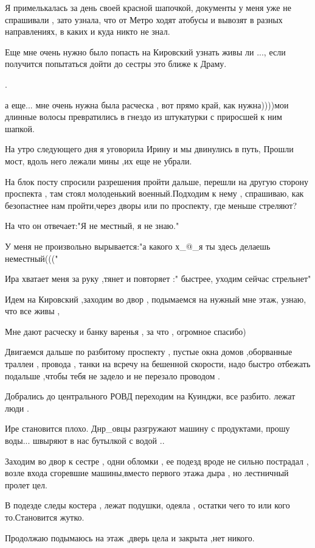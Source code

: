 Я примелькалась за день своей красной шапочкой, документы у меня уже не
спрашивали , зато узнала,  что от Метро ходят атобусы  и вывозят в разных
направлениях, в каких и куда никто не знал.

Еще мне очень нужно было попасть на Кировский узнать живы ли ...,  если
получится попытаться дойти до сестры  это  ближе к Драму. 

.

а еще... мне очень нужна была расческа , вот прямо край, как нужна))))мои
длинные волосы превратились в гнездо из штукатурки с приросшей  к ним шапкой.

На утро следующего дня я уговорила  Ирину и  мы двинулись в путь, Прошли мост,
вдоль него  лежали мины ,их еще не убрали.

На блок посту спросили разрешения пройти дальше,  перешли на другую сторону
проспекта , там стоял молоденький военный.Подходим к нему , спрашиваю, как
безопастнее  нам пройти,через дворы или по проспекту, где меньше стреляют?

На что он отвечает:"Я не местный, я не знаю."

У меня не произвольно вырывается:"а какого х\_@\_я ты здесь делаешь неместный((("

Ира хватает меня за руку ,тянет и повторяет :" быстрее, уходим сейчас
стрельнет"

Идем на Кировский ,заходим во двор , подымаемся на нужный мне этаж, узнаю, что
все живы ,  

Мне дают расческу и банку варенья , за что  , огромное спасибо)

Двигаемся дальше по разбитому проспекту , пустые окна домов ,оборванные траллеи
, провода , танки на всречу на бешенной скорости, надо быстро отбежать подальше
,чтобы тебя не задело и не перезало проводом .

Добрались до центрального РОВД переходим на Куинджи,  все разбито. лежат люди .

Ире становится плохо. Днр\_овцы разгружают машину с продуктами, прошу воды...
швыряют в нас бутылкой с водой ..

Заходим во двор к сестре , одни обломки , ее подезд вроде не сильно пострадал ,
возле входа сгоревшие машины,вместо первого этажа  дыра , но лестничный пролет
цел.

В подезде следы костера , лежат подушки, одеяла , остатки чего то или кого
то.Становится жутко.

Продолжаю подымаюсь на этаж ,дверь цела и закрыта ,нет никого.

